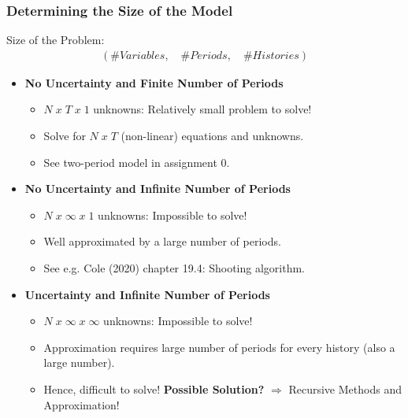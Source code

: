 \documentclass[10pt,c,aspectratio=1610,handout]{beamer}
\begin{document}
\begin{frame}%
  \frametitle{Determining the Size of the Model}%
  \begin{block}{Size of the Problem:}%
    \vspace*{-0.1in}%
    \begin{align*}%
      \left( \# Variables, \quad \# Periods, \quad \# Histories \right)%
    \end{align*}%
    \vspace*{-0.2in}%
  \end{block}%
  \pause%
  \begin{itemize}%
    \item[$\blacktriangleright$] \textbf{No Uncertainty and Finite Number of Periods}%
    \begin{itemize}%
      \item[$\rightarrow$] $N\;x\;T\;x\;1$ unknowns: Relatively small problem to solve!%
      \item[$\rightarrow$] Solve for $N\;x\;T$ (non-linear) equations and unknowns.%
      \item[$\rightarrow$] See two-period model in assignment 0.%
    \end{itemize}%
    \pause%
    \item[$\blacktriangleright$] \textbf{No Uncertainty and Infinite Number of Periods}%
    \begin{itemize}%
      \item[$\rightarrow$] $N\;x\;\infty\;x\;1$ unknowns: Impossible to solve!%
      \item[$\rightarrow$] Well approximated by a large number of periods.%
      \item[$\rightarrow$] See e.g. Cole (2020) chapter 19.4: Shooting algorithm.%
    \end{itemize}%
    \pause%
    \item[$\blacktriangleright$] \textbf{Uncertainty and Infinite Number of Periods}%
    \begin{itemize}%
      \item[$\rightarrow$] $N\;x\;\infty\;x\;\infty$ unknowns: Impossible to solve!%
      \item[$\rightarrow$] Approximation requires large number of periods for every history (also a large number).%
      \item[$\rightarrow$] Hence, difficult to solve! \textbf{\alert{Possible Solution?}} $\Rightarrow$ Recursive Methods and Approximation!%
    \end{itemize}%
  \end{itemize}%
  \vspace*{-0.1in}%
\end{frame}%
\end{document}
